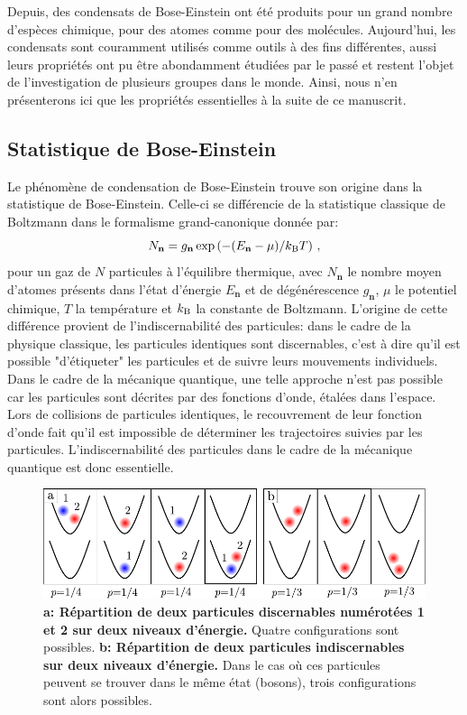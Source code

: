 Depuis, des condensats de Bose-Einstein ont été produits pour un grand nombre d'espèces chimique, pour des atomes comme pour des molécules. Aujourd'hui, les condensats sont couramment utilisés comme outils à des fins différentes, aussi leurs propriétés ont pu être abondamment étudiées par le passé et restent l'objet de l'investigation de plusieurs groupes dans le monde. Ainsi, nous n'en présenterons ici que les propriétés essentielles à la suite de ce manuscrit.

\subsection{Statistique de Bose-Einstein}
Le phénomène de condensation de Bose-Einstein trouve son origine dans la statistique de Bose-Einstein. Celle-ci se différencie de la statistique classique de Boltzmann dans le formalisme grand-canonique donnée par:
\begin{equation}
N_{\mathbf{n}}=g_{\mathbf{n}} \exp{\left( -(E_{\mathbf{n}}-\mu)/k_{\mathrm{B}}T \right)} \text{ ,}
\end{equation}
pour un gaz de $N$ particules à l'équilibre thermique, avec $N_{\mathbf{n}}$ le nombre moyen d'atomes présents dans l'état d'énergie $E_{\mathbf{n}}$ et de dégénérescence $g_{\mathbf{n}}$, $\mu$ le potentiel chimique, $T$ la température et $k_{\mathrm{B}}$ la constante de Boltzmann. L'origine de cette différence provient de l'indiscernabilité des particules: dans le cadre de la physique classique, les particules identiques sont discernables, c'est à dire qu'il est possible "d'étiqueter" les particules et de suivre leurs mouvements individuels.
Dans le cadre de la mécanique quantique, une telle approche n'est pas possible car les particules sont décrites par des fonctions d'onde, étalées dans l'espace. Lors de collisions de particules identiques, le recouvrement de leur fonction d'onde fait qu'il est impossible de déterminer les trajectoires suivies par les particules. L'indiscernabilité des particules dans le cadre de la mécanique quantique est donc essentielle.

\begin{figure}
\centering
\includegraphics[width=\textwidth]{Fig/BEC_manip/stat_bose.pdf}
\caption{\textbf{a: Répartition de deux particules discernables numérotées 1 et 2 sur deux niveaux d'énergie.} Quatre configurations sont possibles. \textbf{b: Répartition de deux particules indiscernables sur deux niveaux d'énergie.} Dans le cas où ces particules peuvent se trouver dans le même état (bosons), trois configurations sont alors possibles.}
\label{fig:stat_bose}
\end{figure}

